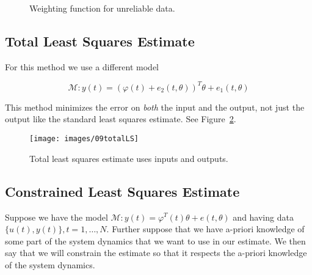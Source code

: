 \begin{figure}[ht!]
\centering
{} \hfill
{} \hfill
\caption{Weighting function for unreliable data.}%
\label{fig:09bad}
\end{figure}

\subsection{Total Least Squares Estimate}
For this method we use a different model

\begin{equation*}
\mathcal{M}: y(t) = {(\varphi(t)+e_2(t,\theta))}^T\theta+e_1(t,\theta)
\end{equation*}

This method minimizes the error on \textit{both} the input and the output, not just the output like the standard least squares estimate.
See Figure~\ref{fig:09totalLS}.

\begin{figure}[ht!]
\centering
\texttt{[image: images/09totalLS]}
\caption{Total least squares estimate uses inputs and outputs.}%
\label{fig:09totalLS}
\end{figure}

\subsection{Constrained Least Squares Estimate}
Suppose we have the model $\mathcal{M}: y(t) = \varphi^T(t)\theta + e(t,\theta)$ and having data $\{u(t),y(t)\}, t=1,\ldots,N$.
Further suppose that we have a-priori knowledge of some part of the system dynamics that we want to use in our estimate.
We then say that we will constrain the estimate so that it respects the a-priori knowledge of the system dynamics.


